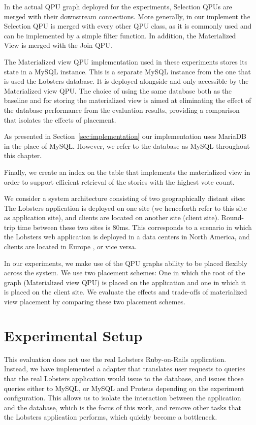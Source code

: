 In the actual QPU graph deployed for the experiments, Selection QPUs are merged with their downstream connections.
More generally, in our implement the Selection QPU is merged with every other QPU class,
as it is commonly used and can be implemented by a simple filter function.
In addition, the Materialized View is merged with the Join QPU.

The Materialized view QPU implementation used in these experiments stores its state in a MySQL instance.
This is a separate MySQL instance from the one that is used the Lobsters database.
It is deployed alongside and only accessible by the Materialized view QPU.
The choice of using the same database both as the baseline and for storing the materialized view is aimed at eliminating
the effect of the database performance from the evaluation results,
providing a comparison that isolates the effects of placement.

As presented in Section~\ref{sec:implementation} our implementation uses MariaDB in the place of MySQL.
However, we refer to the database as MySQL throughout this chapter.

Finally, we create an index on the table that implements the materialized view in order to support efficient retrieval of
the stories with the highest vote count.

\bigskip
\noindent
We consider a system architecture consisting of two geographically distant sites:
The Lobsters application is deployed on one site (we henceforth refer to this site as application site),
and clients are located on another site (client site).
Round-trip time between these two sites is 80ms.
This corresponds to a scenario in which the Lobsters web application is deployed in a data centers in North America,
and clients are located in Europe \cite{pbailis:hats}, or vice versa.

In our experiments, we make use of the QPU graphs ability to be placed flexibly across the system.
We use two placement schemes:
One in which the root of the graph (Materialized view QPU) is placed on the application and one in which it is placed on
the client site.
We evaluate the effects and trade-offs of materialized view placement by comparing these two placement schemes.


\section{Experimental Setup}

This evaluation does not use the real Lobsters Ruby-on-Rails application.
Instead, we have implemented a adapter that translates user requests to queries that the real
Lobsters application would issue to the database,
and issues those queries either to MySQL, or MySQL and Proteus depending on the experiment configuration.
This allows us to isolate the interaction between the application and the database, which is the focus of this work,
and remove other tasks that the Lobsters application performs, which quickly become a bottleneck.

